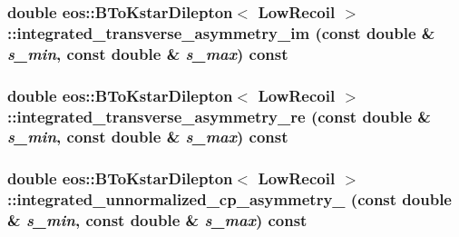 \label{classeos_1_1BToKstarDilepton_3_01LowRecoil_01_4_ae61a3da96c051d1b5da3bb7fcd1b42bc}
\hypertarget{classeos_1_1BToKstarDilepton_3_01LowRecoil_01_4_af3583a95af682bacc01b1c44aa3f972b}{
\subsubsection[{integrated\_\-transverse\_\-asymmetry\_\-im}]{\setlength{\rightskip}{0pt plus 5cm}double eos::BToKstarDilepton$<$ {\bf LowRecoil} $>$::integrated\_\-transverse\_\-asymmetry\_\-im (const double \& {\em s\_\-min}, \/  const double \& {\em s\_\-max}) const}}
\label{classeos_1_1BToKstarDilepton_3_01LowRecoil_01_4_af3583a95af682bacc01b1c44aa3f972b}
\hypertarget{classeos_1_1BToKstarDilepton_3_01LowRecoil_01_4_a37f2d54a7ebd46bece004e8154b1b581}{
\subsubsection[{integrated\_\-transverse\_\-asymmetry\_\-re}]{\setlength{\rightskip}{0pt plus 5cm}double eos::BToKstarDilepton$<$ {\bf LowRecoil} $>$::integrated\_\-transverse\_\-asymmetry\_\-re (const double \& {\em s\_\-min}, \/  const double \& {\em s\_\-max}) const}}
\label{classeos_1_1BToKstarDilepton_3_01LowRecoil_01_4_a37f2d54a7ebd46bece004e8154b1b581}
\hypertarget{classeos_1_1BToKstarDilepton_3_01LowRecoil_01_4_a239381fa63ad8dc532e1048f592a57f8}{
\subsubsection[{integrated\_\-unnormalized\_\-cp\_\-asymmetry\_\-1}]{\setlength{\rightskip}{0pt plus 5cm}double eos::BToKstarDilepton$<$ {\bf LowRecoil} $>$::integrated\_\-unnormalized\_\-cp\_\-asymmetry\_ (const double \& {\em s\_\-min}, \/  const double \& {\em s\_\-max}) const}}
